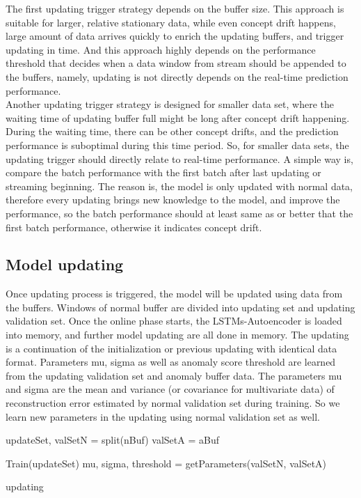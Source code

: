 The first updating trigger strategy depends on the buffer size. This approach is suitable for larger, relative stationary data, while even concept drift happens, large amount of data arrives quickly to enrich the updating buffers, and trigger updating in time. And this approach highly depends on the performance threshold that decides when a data window from stream should be appended to the buffers, namely, updating is not directly depends on the real-time prediction performance. \\

Another updating trigger strategy is designed for smaller data set, where the waiting time of updating buffer full might be long after concept drift happening. During the waiting time, there can be other concept drifts, and the prediction performance is suboptimal during this time period. So, for smaller data sets, the updating trigger should directly relate to real-time performance. A simple way is, compare the batch performance with the first batch after last updating or streaming beginning. The reason is, the model is only updated with normal data, therefore every updating brings new knowledge to the model, and improve the performance, so the batch performance should at least same as or better that the first batch performance, otherwise it indicates concept drift.\\


\subsection{Model updating}
\label{updating}

Once updating process is triggered, the model will be updated using data from the buffers. Windows of normal buffer are divided into updating set and updating validation set. Once the online phase starts, the LSTMs-Autoencoder is loaded into memory, and further model updating are all done in memory. The updating is a continuation of the initialization or previous updating with identical data format. Parameters mu, sigma as well as anomaly score threshold are learned from the updating validation set and anomaly buffer data. The parameters mu and sigma are the mean and variance (or covariance for multivariate data) of reconstruction error estimated by normal validation set during training. So we learn new parameters in the updating using normal validation set as well.

\begin{algorithm}[h]

\BlankLine 
updateSet, valSetN = split(nBuf)\;
valSetA = aBuf\;

Train(updateSet)\;
mu, sigma, threshold = getParameters(valSetN, valSetA)

\caption{updating}
\label{alg:update}
\end{algorithm}




